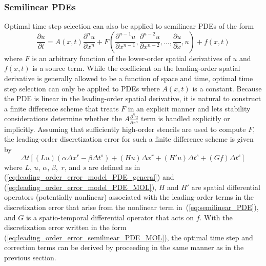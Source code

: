 \documentclass[fleqn,12pt,twoside]{article}
\newcommand{\beq}{\begin{equation}}
\newcommand{\eeq}{\end{equation}}
\def\dt{\Delta t}
\def\dx{\Delta x}
\begin{document}
\subsubsection*{Semilinear PDEs}
Optimal time step selection can also be applied to semilinear PDEs of the
form
\beq
  \frac{\partial u}{\partial t} = A(x,t) \frac{\partial^n u}{\partial x^n}
  + F \left( \frac{\partial^{n-1} u}{\partial x^{n-1}},
      \frac{\partial^{n-2} u}{\partial x^{n-2}}, \ldots,
      \frac{\partial u}{\partial x}, u \right)
  + f(x,t)
  \label{eq:semilinear_PDE}
\eeq
where $F$ is an arbitrary function of the lower-order spatial derivatives
of $u$ and $f(x,t)$ is a source term.  While the coefficient on the 
leading-order spatial derivative is generally allowed to be a function of 
space and time, optimal time step selection can only be applied to PDEs where
$A(x,t)$ is a constant.  Because the PDE is linear in the leading-order 
spatial derivative, it is natural to construct a finite difference scheme that 
treats $F$ in an explicit manner and lets stability considerations determine 
whether the $A \frac{\partial^n u}{\partial x^n}$ term is handled explicitly 
or implicitly.  Assuming that sufficiently high-order stencils are used to 
compute $F$, the leading-order discretization error for such a finite 
difference scheme is given by
\beq
  \dt \left[ (L u) (\alpha \dx^r - \beta \dt^s) 
  + \left( H u \right) \dx^r 
  + \left( H' u \right) \dt^s
  + (G f) \dt^s \right]
  \label{eq:leading_order_error_semilinear_PDE_MOL}
\eeq
where $L$, $u$, $\alpha$, $\beta,$ $r$, and $s$ are defined as in
(\ref{eq:leading_order_error_model_PDE_general}) and
(\ref{eq:leading_order_error_model_PDE_MOL}), $H$ and $H'$ are spatial 
differential operators (potentially nonlinear) associated with the 
leading-order terms in the discretization error that arise from the nonlinear 
term in~(\ref{eq:semilinear_PDE}), and $G$ is a spatio-temporal differential 
operator that acts on $f$.  With the discretization error written in the 
form (\ref{eq:leading_order_error_semilinear_PDE_MOL}), the optimal time 
step and correction terms can be derived by proceeding in the same manner 
as in the previous section.
\end{document}
